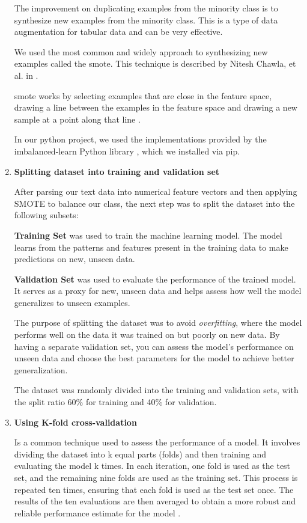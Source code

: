 \begin{enumerate}
 The improvement on duplicating examples from the minority class is to synthesize new examples from the minority class. This is a type of data augmentation for tabular data and can be very effective.

 We used the most common and widely approach to synthesizing new examples called the \gls{smote}. This technique is described by Nitesh Chawla, et al. in \cite{chawla2002smote}.

 \gls{smote} works by selecting examples that are close in the feature space, drawing a line between the examples in the feature space and drawing a new sample at a point along that line \cite{SMOTE_Jason}.

In our python project, we used the implementations provided by the imbalanced-learn Python library \cite{imbalanced_scikit}, which we installed via pip.


\item \textbf{Splitting dataset into training and validation set}

After parsing our text data into numerical feature vectors and then applying SMOTE to balance our class, the next step was to split the dataset into the following subsets:

\textbf{Training Set} was used to train the machine learning model. The model learns from the patterns and features present in the training data to make predictions on new, unseen data.

\textbf{Validation Set} was used to evaluate the performance of the trained model. It serves as a proxy for new, unseen data and helps assess how well the model generalizes to unseen examples.


The purpose of splitting the dataset was to avoid \textit{overfitting}, where the model performs well on the data it was trained on but poorly on new data. By having a separate validation set, you can assess the model's performance on unseen data and choose the best parameters for the model to achieve better generalization.

The dataset was randomly divided into the training and validation sets, with the split ratio 60\% for training and 40\% for validation.

\item \textbf{Using K-fold cross-validation}

Is a common technique used to assess the performance of a model. It involves dividing the dataset into k equal parts (folds) and then training and evaluating the model k times. In each iteration, one fold is used as the test set, and the remaining nine folds are used as the training set. This process is repeated ten times, ensuring that each fold is used as the test set once. The results of the ten evaluations are then averaged to obtain a more robust and reliable performance estimate for the model \cite{inbook_Cross_Validation}.


\end{enumerate}
